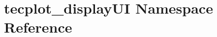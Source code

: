 \hypertarget{namespacetecplot__display_u_i}{}\section{tecplot\+\_\+display\+UI Namespace Reference}
\label{namespacetecplot__display_u_i}
